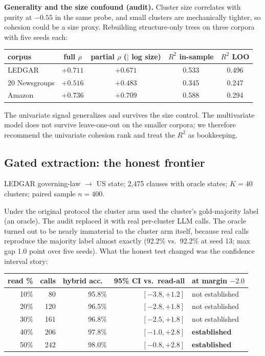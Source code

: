 \documentclass[11pt]{article}
\begin{document}
\textbf{Generality and the size confound (audit).} Cluster size correlates with purity at $-0.55$ in the same probe, and small clusters are mechanically tighter, so cohesion could be a size proxy. Rebuilding structure-only trees on three corpora with five seeds each:

\begin{center}
\begin{tabular}{lcccc}
\toprule
corpus & full $\rho$ & partial $\rho$ ($|$ log size) & $R^2$ in-sample & $R^2$ LOO \\
\midrule
LEDGAR & $+0.711$ & $+0.671$ & 0.533 & 0.496 \\
20 Newsgroups & $+0.516$ & $+0.483$ & 0.345 & 0.247 \\
Amazon & $+0.736$ & $+0.709$ & 0.588 & 0.294 \\
\bottomrule
\end{tabular}
\end{center}

The univariate signal generalizes and survives the size control. The multivariate model does not survive leave-one-out on the smaller corpora; we therefore recommend the univariate cohesion rank and treat the $R^2$ as bookkeeping.

\subsection{Gated extraction: the honest frontier}\label{sec:frontier}
LEDGAR governing-law $\rightarrow$ US state; 2{,}475 clauses with oracle states; $K{=}40$ clusters; paired sample $n{=}400$.

Under the original protocol the cluster arm used the cluster's gold-majority label (an oracle). The audit replaced it with real per-cluster LLM calls. The oracle turned out to be nearly immaterial to the cluster arm itself, because real calls reproduce the majority label almost exactly (92.2\% vs.\ 92.2\% at seed 13; max gap 1.0 point over five seeds). What the honest test changed was the confidence interval story:

\begin{center}
\begin{tabular}{rrrrl}
\toprule
read \% & calls & hybrid acc.\ & 95\% CI vs.\ read-all & at margin $-2.0$ \\
\midrule
10\% & 80 & 95.8\% & $[-3.8, +1.2]$ & not established \\
20\% & 120 & 96.5\% & $[-2.8, +1.8]$ & not established \\
30\% & 161 & 96.8\% & $[-2.5, +1.8]$ & not established \\
40\% & 206 & 97.8\% & $[-1.0, +2.8]$ & \textbf{established} \\
50\% & 242 & 98.0\% & $[-0.8, +2.8]$ & \textbf{established} \\
\bottomrule
\end{tabular}
\end{center}
\end{document}
